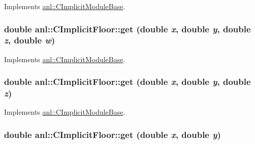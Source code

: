 Implements \hyperlink{classanl_1_1CImplicitModuleBase_aa40b7d54572197612a4fea44b63447eb}{anl::CImplicitModuleBase}.\hypertarget{classanl_1_1CImplicitFloor_ae6b0c4cf4b5616de73ff319cc976e701}{
\subsubsection[{get}]{\setlength{\rightskip}{0pt plus 5cm}double anl::CImplicitFloor::get (double {\em x}, \/  double {\em y}, \/  double {\em z}, \/  double {\em w})}}
\label{classanl_1_1CImplicitFloor_ae6b0c4cf4b5616de73ff319cc976e701}


Implements \hyperlink{classanl_1_1CImplicitModuleBase_a3cf520bdab59631864253c03b4e1723f}{anl::CImplicitModuleBase}.\hypertarget{classanl_1_1CImplicitFloor_ae73876cea1480c84adc05b83cca26255}{
\subsubsection[{get}]{\setlength{\rightskip}{0pt plus 5cm}double anl::CImplicitFloor::get (double {\em x}, \/  double {\em y}, \/  double {\em z})}}
\label{classanl_1_1CImplicitFloor_ae73876cea1480c84adc05b83cca26255}


Implements \hyperlink{classanl_1_1CImplicitModuleBase_ac17d592612c82ba3d47f9229a00b1fe3}{anl::CImplicitModuleBase}.\hypertarget{classanl_1_1CImplicitFloor_ad2a70f69657f5e662ce91f45e3a84a75}{
\subsubsection[{get}]{\setlength{\rightskip}{0pt plus 5cm}double anl::CImplicitFloor::get (double {\em x}, \/  double {\em y})}}
\label{classanl_1_1CImplicitFloor_ad2a70f69657f5e662ce91f45e3a84a75}


